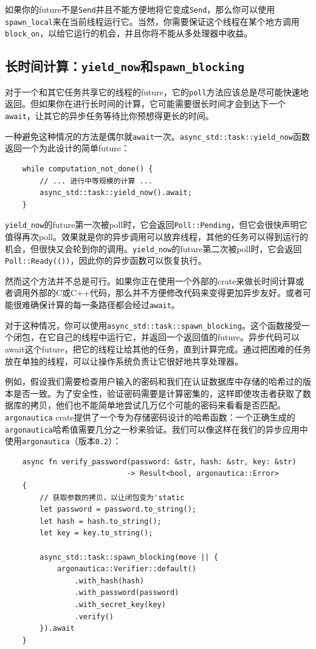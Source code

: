 如果你的future不是\texttt{Send}并且不能方便地将它变成\texttt{Send}，那么你可以使用\texttt{spawn\_local}来在当前线程运行它。当然，你需要保证这个线程在某个地方调用\texttt{block\_on}，以给它运行的机会，并且你将不能从多处理器中收益。

\subsection{长时间计算：\texttt{yield\_now}和\texttt{spawn\_blocking}}\label{LongCompute}

对于一个和其它任务共享它的线程的future，它的\texttt{poll}方法应该总是尽可能快速地返回。但如果你在进行长时间的计算，它可能需要很长时间才会到达下一个\texttt{await}，让其它的异步任务等待比你预想得更长的时间。

一种避免这种情况的方法是偶尔就\texttt{await}一次。\texttt{async\_std::task::yield\_now}函数返回一个为此设计的简单future：
\begin{verbatim}
    while computation_not_done() {
        // ... 进行中等规模的计算 ...
        async_std::task::yield_now().await;
    }
\end{verbatim}

\texttt{yield\_now}的future第一次被poll时，它会返回\texttt{Poll::Pending}，但它会很快声明它值得再次poll。效果就是你的异步调用可以放弃线程，其他的任务可以得到运行的机会，但很快又会轮到你的调用。\texttt{yield\_now}的future第二次被poll时，它会返回\texttt{Poll::Ready(())}，因此你的异步函数可以恢复执行。

然而这个方法并不总是可行。如果你正在使用一个外部的crate来做长时间计算或者调用外部的C或C++代码，那么并不方便修改代码来变得更加异步友好。或者可能很难确保计算的每一条路径都会经过\texttt{await}。

对于这种情况，你可以使用\texttt{async\_std::task::spawn\_blocking}。这个函数接受一个闭包，在它自己的线程中运行它，并返回一个返回值的future。异步代码可以await这个future，把它的线程让给其他的任务，直到计算完成。通过把困难的任务放在单独的线程，可以让操作系统负责让它很好地共享处理器。

例如，假设我们需要检查用户输入的密码和我们在认证数据库中存储的哈希过的版本是否一致。为了安全性，验证密码需要是计算密集的，这样即使攻击者获取了数据库的拷贝，他们也不能简单地尝试几万亿个可能的密码来看看是否匹配。\texttt{argonautica} crate提供了一个专为存储密码设计的哈希函数：一个正确生成的\texttt{argonautica}哈希值需要几分之一秒来验证。我们可以像这样在我们的异步应用中使用\texttt{argonautica}（版本\texttt{0.2}）：
\begin{verbatim}
    async fn verify_password(password: &str, hash: &str, key: &str)
                            -> Result<bool, argonautica::Error>
    {
        // 获取参数的拷贝，以让闭包变为'static
        let password = password.to_string();
        let hash = hash.to_string();
        let key = key.to_string();

        async_std::task::spawn_blocking(move || {
            argonautica::Verifier::default()
                .with_hash(hash)
                .with_password(password)
                .with_secret_key(key)
                .verify()
        }).await
    }
\end{verbatim}

